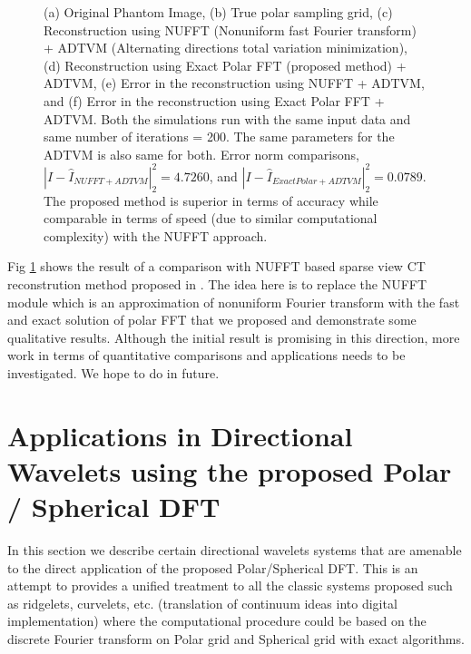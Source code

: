 \documentclass{UCF_ETD}
\begin{document}
\begin{figure}[H]
\begin{center}
\caption{(a) Original Phantom Image, (b) True polar sampling grid, (c) Reconstruction using NUFFT (Nonuniform fast Fourier transform) + ADTVM (Alternating directions total variation minimization), (d) Reconstruction using Exact Polar FFT (proposed method)  + ADTVM, (e) Error in the reconstruction using NUFFT + ADTVM, and (f) Error in the reconstruction using Exact Polar FFT + ADTVM. Both the simulations run with the same input data and same number of iterations = 200. The same parameters for the ADTVM is also same for both. Error norm comparisons, $|I-\hat{I}_{NUFFT+ADTVM}|^2_2 = 4.7260$, and  $|I-\hat{I}_{ExactPolar+ADTVM}|^2_2 = 0.0789$. The proposed method is superior in terms of accuracy while comparable in terms of speed (due to similar computational complexity) with the NUFFT approach.}
\label{PhantomDataEval.fig}
\end{center}
\end{figure}

Fig \ref{PhantomDataEval.fig} shows the result of a comparison with NUFFT based sparse view CT reconstrution method proposed in \cite{Yan2015}. The idea here is to replace the NUFFT module which is an approximation of nonuniform Fourier transform with the fast and exact solution of polar FFT that we proposed and demonstrate some qualitative results. Although the initial result is promising in this direction, more work in terms of quantitative comparisons and applications needs to be investigated. We hope to do in future. 

\section{Applications in Directional Wavelets using the proposed Polar / Spherical DFT }
In this section we describe certain directional wavelets systems that are amenable to the direct application of the proposed Polar/Spherical DFT. This is an attempt to provides a unified treatment to all the classic systems proposed such as ridgelets, curvelets, etc. (translation of continuum ideas into digital implementation) where the computational procedure could be based on the discrete Fourier transform on Polar grid and Spherical grid with exact algorithms. 
\end{document}
